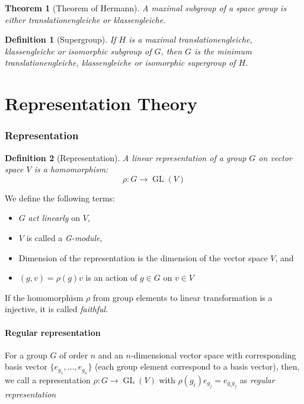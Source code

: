 \documentclass{amsart}
\newtheorem{definition}{Definition}
\newtheorem{theorem}{Theorem}
\DeclareMathOperator{\GL}{GL}
\begin{document}
\begin{theorem}
    [Theorem of Hermann]
    A maximal subgroup of a space group is either translationengleiche or klassengleiche.
\end{theorem}

\vspace{10pt}

\begin{definition}
    [Supergroup]
    If $H$ is a maximal translationengleiche, klassengleiche or isomorphic subgroup of $G$, then $G$
    is the minimum translationengleiche, klassengleiche or isomorphic supergroup of $H$.
\end{definition}


\newpage
\part{Representation Theory}

\section*{Representation}

\begin{definition}
    [Representation]
    A linear representation of a group $G$ on vector space $V$ is a homomorphism:
    \[\rho\colon G\to \GL(V)\]
\end{definition}
We define the following terms:
\begin{itemize}
    \item $G$ \emph{act linearly} on $V$,
    \item $V$ is called a \emph{G-module},
    \item Dimension of the representation is the dimension of the vector space $V$, and
    \item $(g,v)=\rho(g)v$ is an action of $g\in G$ on $v\in V$ 
\end{itemize}
If the homomorphism $\rho$ from group elements to linear transformation is a injective, 
it is called \emph{faithful}.

\subsection*{Regular representation}
For a group $G$ of order $n$ and an $n$-dimensional vector space with corresponding basis vector 
$\{e_{g_1},\dots,e_{g_n}\}$ (each group element correspond to a basis vector), then, 
we call a representation $\rho\colon G\to \GL(V)$ with $\rho(g_i) e_{g_j} = e_{g_i g_j}$
as \emph{regular representation}
\end{document}

